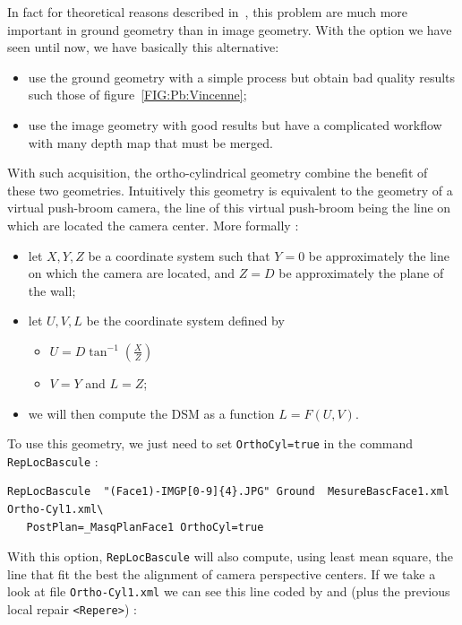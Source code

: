 In fact for theoretical reasons described in~\cite{Penard},
this problem are  much more important in ground geometry than in image geometry.
With the option we have seen until now, we have basically this alternative:

\begin{itemize}
   \item  use the ground geometry with a simple process but obtain bad quality results such those of
          figure~\ref{FIG:Pb:Vincenne};

   \item  use the image geometry with  good results but have a complicated workflow with many depth map
          that must be merged.
\end{itemize}


With such acquisition, the ortho-cylindrical geometry combine the benefit of these
two geometries. Intuitively this geometry is equivalent to the geometry of a virtual push-broom
camera, the line of this virtual push-broom being the line on which are located the
camera center. More formally :


\begin{itemize}
   \item  let  $X,Y,Z$ be a coordinate system such that $Y=0$ be approximately the line on which the camera
          are located, and $Z=D$ be approximately the plane of the wall;

   \item  let  $U,V,L$ be the coordinate system defined by
\begin{itemize}
    \item  $U= D \tan^{-1} (\frac{X}{Z})$
    \item  $V=Y$ and $L=Z$;
\end{itemize}
   \item   we  will then compute the DSM as a function $L= F(U,V)$.
\end{itemize}

To use this geometry, we just need to set {\tt OrthoCyl=true} in the command {\tt RepLocBascule} :

\begin{verbatim}
RepLocBascule  "(Face1)-IMGP[0-9]{4}.JPG" Ground  MesureBascFace1.xml Ortho-Cyl1.xml\
   PostPlan=_MasqPlanFace1 OrthoCyl=true
\end{verbatim}

With this option, {\tt RepLocBascule} will also compute, using least mean square,
the line that fit the best the alignment of camera perspective centers. If we take
a look at file {\tt Ortho-Cyl1.xml} we can see  this line coded by {\tt <P0>}
and {\tt <P1>}  (plus the previous local repair  {\tt <Repere>}) :

